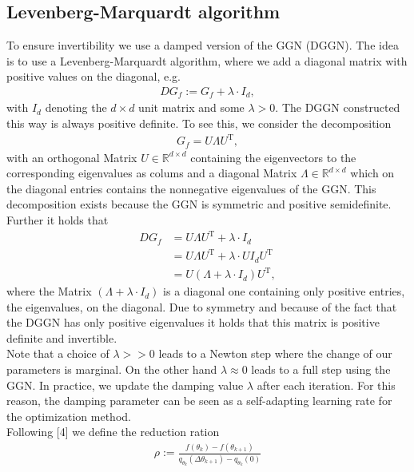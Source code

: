 \documentclass[conference]{IEEEtran}
\begin{document}
\subsection{Levenberg-Marquardt algorithm }
\noindent
To ensure invertibility we use a damped version of the GGN (DGGN). The idea is to use a Levenberg-Marquardt algorithm, where we add a diagonal matrix with positive values on the diagonal, e.g.
\begin{align}
DG_{f} := G_{f} + \lambda\cdot I_{d},
\end{align}
with $I_{d}$ denoting the $d\times d$ unit matrix and some $\lambda>0$.
The DGGN constructed this way is always positive definite. 
To see this, we consider the decomposition
\begin{align}
G_{f} = U\Lambda U^{\mathrm{T}},
\end{align}
with an orthogonal Matrix $U\in\mathbb{R}^{d\times d}$ containing the eigenvectors to the corresponding eigenvalues as colums and a diagonal Matrix $\Lambda\in\mathbb{R}^{d\times d}$ which on the diagonal entries contains the nonnegative eigenvalues of the GGN. This decomposition exists because the GGN is symmetric and positive semidefinite. Further it holds that
\begin{align}
DG_{f} &= U\Lambda U^{\mathrm{T}} + \lambda\cdot I_{d}\\
&= U\Lambda U^{\mathrm{T}} + \lambda\cdot U I_{d}U^{\mathrm{T}}\\
&= U\left(\Lambda + \lambda\cdot I_{d}\right)U^{\mathrm{T}},
\end{align}
where the Matrix $\left(\Lambda + \lambda\cdot I_{d}\right)$ is a diagonal one containing only positive entries, the eigenvalues, on the diagonal. Due to symmetry and because of the fact that the DGGN has only positive eigenvalues it holds that this matrix is positive definite and invertible.\\
Note that a choice of $\lambda>>0$ leads to a Newton step where the change of our parameters is marginal. On the other hand $\lambda\approx 0$ leads to a full step using the GGN. In practice, we update the damping value $\lambda$ after each iteration. For this reason, the damping parameter can be seen as a self-adapting learning rate for the optimization method.\\
Following [4] we define the reduction ration
\begin{align}
\rho := \frac{f(\theta_{k}) - f(\theta_{k+1})}{q_{\theta_{k}}(\Delta\theta_{k + 1}) - q_{\theta_{k}}(0)}
\end{align}
\end{document}
